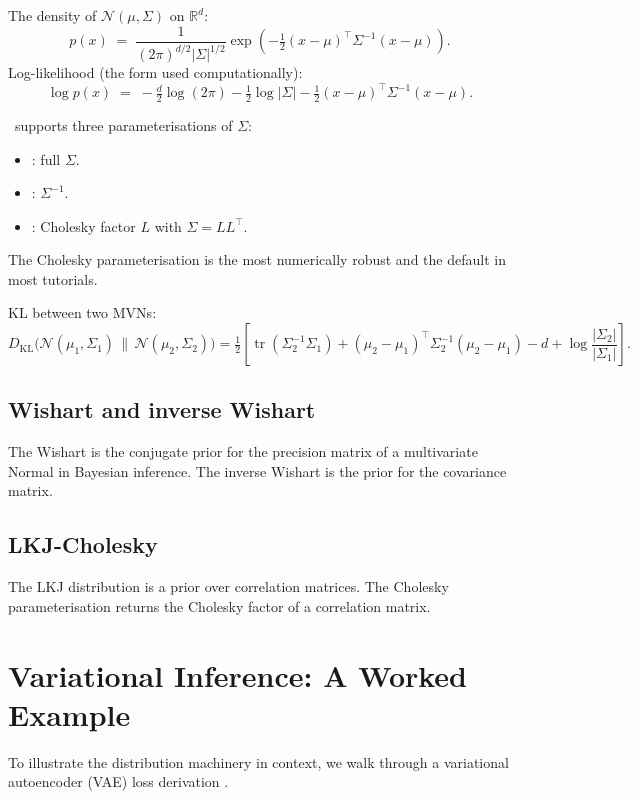 The density of $\mathcal{N}(\mu, \Sigma)$ on $\mathbb{R}^d$:
\[
p(x) \;=\; \frac{1}{(2\pi)^{d/2} |\Sigma|^{1/2}}
\exp\!\left(-\tfrac{1}{2}(x - \mu)^\top \Sigma^{-1} (x - \mu)\right).
\]
Log-likelihood (the form used computationally):
\[
\log p(x) \;=\; -\tfrac{d}{2}\log(2\pi) - \tfrac{1}{2}\log|\Sigma|
- \tfrac{1}{2}(x - \mu)^\top \Sigma^{-1} (x - \mu).
\]

\Lucid\ supports three parameterisations of $\Sigma$:
\begin{itemize}
  \item {}: full $\Sigma$.
  \item {}: $\Sigma^{-1}$.
  \item {}: Cholesky factor $L$ with $\Sigma = L
    L^\top$.
\end{itemize}
The Cholesky parameterisation is the most numerically robust and
the default in most tutorials.

KL between two MVNs:
\[
D_{\mathrm{KL}}\!\bigl(\mathcal{N}(\mu_1, \Sigma_1) \,\|\, \mathcal{N}(\mu_2, \Sigma_2)\bigr)
= \tfrac{1}{2}\!\left[\operatorname{tr}(\Sigma_2^{-1} \Sigma_1)
+ (\mu_2 - \mu_1)^\top \Sigma_2^{-1} (\mu_2 - \mu_1)
- d + \log\frac{|\Sigma_2|}{|\Sigma_1|}\right].
\]

\subsection{Wishart and inverse Wishart}
\label{ssec:distributions:wishart}

The Wishart is the conjugate prior for the precision matrix of a
multivariate Normal in Bayesian inference. The inverse Wishart is
the prior for the covariance matrix.

\subsection{LKJ-Cholesky}
\label{ssec:distributions:lkj}

The LKJ distribution is a prior over correlation matrices. The
Cholesky parameterisation 
returns the Cholesky factor of a correlation matrix.

\section{Variational Inference: A Worked Example}
\label{sec:distributions:vi_detail}

To illustrate the distribution machinery in context, we walk
through a variational autoencoder (VAE) loss derivation
\cite{kingma_vae_2014}.

